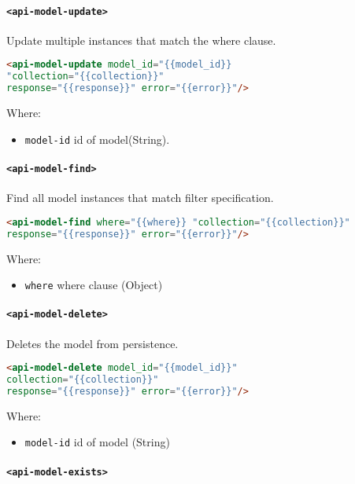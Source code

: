 \paragraph{\texttt{<api-model-update>}}

Update multiple instances that match the where clause.

\begin{lstlisting}[language=html]
<api-model-update model_id="{{model_id}} 
"collection="{{collection}}" 
response="{{response}}" error="{{error}}"/>
\end{lstlisting}
Where:
\begin{itemize}
\item \texttt{model-id} id of model(String).
\end{itemize}

\paragraph{\texttt{<api-model-find>}}

Find all model instances that match filter specification.

\begin{lstlisting}[language=html]
<api-model-find where="{{where}} "collection="{{collection}}" 
response="{{response}}" error="{{error}}"/>
\end{lstlisting}
Where:
\begin{itemize}
\item \texttt{where} where clause (Object)
\end{itemize}

\paragraph{\texttt{<api-model-delete>}}

Deletes the model from persistence.

\begin{lstlisting}[language=html]
<api-model-delete model_id="{{model_id}}" 
collection="{{collection}}" 
response="{{response}}" error="{{error}}"/>
\end{lstlisting}
Where:
\begin{itemize}
\item \texttt{model-id} id of model (String)
\end{itemize}

\paragraph{\texttt{<api-model-exists>}}


